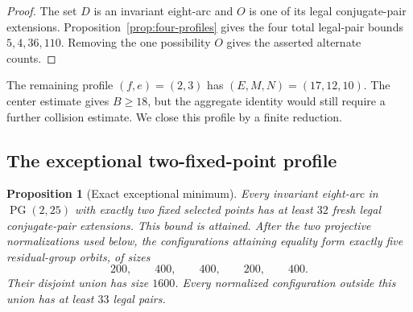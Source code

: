 \documentclass[11pt]{article}
\newtheorem{proposition}[theorem]{Proposition}
\theoremstyle{definition}
\theoremstyle{remark}
\newcommand{\PG}{\operatorname{PG}}
\begin{document}
\begin{proof}
The set $D$ is an invariant eight-arc and $O$ is one of its legal
conjugate-pair extensions.  Proposition~\ref{prop:four-profiles} gives the
four total legal-pair bounds $5,4,36,110$.  Removing the one possibility
$O$ gives the asserted alternate counts.
\end{proof}

The remaining profile $(f,e)=(2,3)$ has $(E,M,N)=(17,12,10)$.  The center
estimate gives $B\ge18$, but the aggregate identity would still require a
further collision estimate.  We close this profile by a finite reduction.

\subsection*{The exceptional two-fixed-point profile}

\begin{proposition}[Exact exceptional minimum]\label{prop:f2}
Every invariant eight-arc in $\PG(2,25)$ with exactly two fixed selected
points has at least $32$ fresh legal conjugate-pair extensions.  This bound
is attained.  After the two projective normalizations used below, the
configurations attaining equality form exactly five residual-group orbits,
of sizes
\[
  200,\qquad 400,\qquad 400,\qquad 200,\qquad 400.
\]
Their disjoint union has size $1600$.  Every normalized configuration
outside this union has at least $33$ legal pairs.
\end{proposition}
\end{document}
